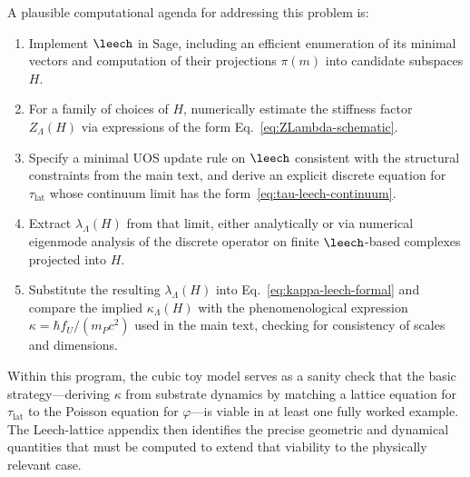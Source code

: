 A plausible computational agenda for addressing this problem is:
\begin{enumerate}
  \item Implement $\leech$ in Sage, including an efficient enumeration of its
        minimal vectors and computation of their projections $\pi(m)$ into
        candidate subspaces $H$.
  \item For a family of choices of $H$, numerically estimate the stiffness
        factor $Z_{\Lambda}(H)$ via expressions of the form
        Eq.~\eqref{eq:ZLambda-schematic}.
  \item Specify a minimal UOS update rule on $\leech$ consistent with the
        structural constraints from the main text, and derive an explicit
        discrete equation for $\tau_{\mathrm{lat}}$ whose continuum limit has
        the form~\eqref{eq:tau-leech-continuum}.
  \item Extract $\lambda_{\Lambda}(H)$ from that limit, either analytically
        or via numerical eigenmode analysis of the discrete operator on
        finite $\leech$-based complexes projected into $H$.
  \item Substitute the resulting $\lambda_{\Lambda}(H)$ into
        Eq.~\eqref{eq:kappa-leech-formal} and compare the implied
        $\kappa_{\Lambda}(H)$ with the phenomenological expression
        $\kappa = \hbar f_U/(m_P c^2)$ used in the main text, checking for
        consistency of scales and dimensions.
\end{enumerate}

Within this program, the cubic toy model serves as a sanity check that the
basic strategy---deriving $\kappa$ from substrate dynamics by matching a
lattice equation for $\tau_{\mathrm{lat}}$ to the Poisson equation for
$\varphi$---is viable in at least one fully worked example. The Leech-lattice
appendix then identifies the precise geometric and dynamical quantities that
must be computed to extend that viability to the physically relevant case.

